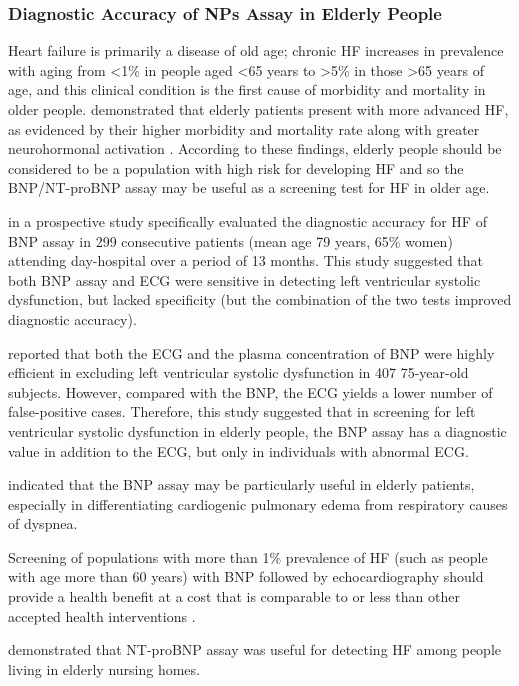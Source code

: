 \documentclass[14pt,a4paper,onecolumn]{extarticle}
\begin{document}
\subsubsection{ Diagnostic Accuracy of NPs Assay in Elderly People}



Heart failure is primarily a disease of old age; chronic HF increases in prevalence with aging from <1\% in people aged <65 years to >5\% in those >65 years of age, and this clinical condition is the first cause of morbidity and mortality in older people. \citep{bib3193} demonstrated that elderly patients present with more advanced HF, as evidenced by their higher morbidity and mortality rate along with greater neurohormonal activation . According to these findings, elderly people should be considered to be a population with high risk for developing HF and so the BNP/NT-proBNP assay may be useful as a screening test for HF in older age.

\citep{bib3143} in a prospective study specifically evaluated the diagnostic accuracy for HF of BNP assay in 299 consecutive patients (mean age 79 years, 65\% women) attending day-hospital over a period of 13 months. This study suggested that both BNP assay and ECG were sensitive in detecting left ventricular systolic dysfunction, but lacked specificity (but the combination of the two tests improved diagnostic accuracy).



\citep{bib3172} reported that both the ECG and the plasma concentration of BNP were highly efficient in excluding left ventricular systolic dysfunction in 407 75-year-old subjects. However, compared with the BNP, the ECG yields a lower number of false-positive cases. Therefore, this study suggested that in screening for left ventricular systolic dysfunction in elderly people, the BNP assay has a diagnostic value in addition to the ECG, but only in individuals with abnormal ECG.

\citep{bib3146} indicated that the BNP assay may be particularly useful in elderly patients, especially in differentiating cardiogenic pulmonary edema from respiratory causes of dyspnea.

Screening of populations with more than 1\% prevalence of HF (such as people with age more than 60 years) with BNP followed by echocardiography should provide a health benefit at a cost that is comparable to or less than other accepted health interventions \citep{bib3145}.

\citep{bib3147} demonstrated that NT-proBNP assay was useful for detecting HF among people living in elderly nursing homes.
\end{document}
